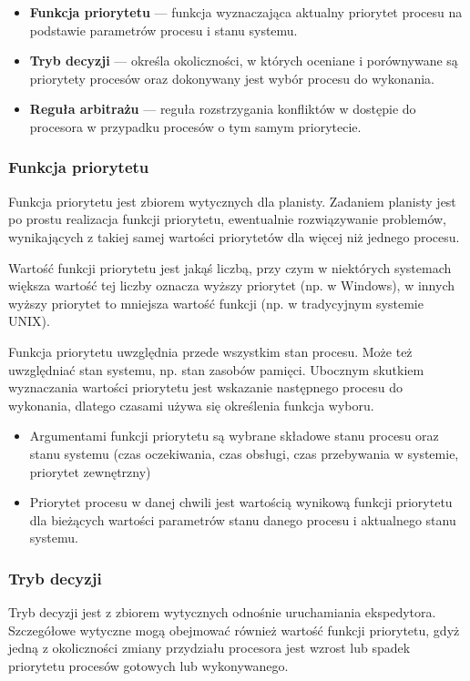 \documentclass[main.tex]{subfiles}
\begin{document}
    \begin{itemize}
        \item \textbf{Funkcja priorytetu} — funkcja wyznaczająca aktualny priorytet procesu na podstawie parametrów procesu i stanu systemu.
        \item \textbf{Tryb decyzji} — określa okoliczności, w których oceniane i porównywane są priorytety procesów oraz dokonywany jest wybór procesu do wykonania.
        \item \textbf{Reguła arbitrażu} — reguła rozstrzygania konfliktów w dostępie do procesora w przypadku procesów o tym samym priorytecie.
    \end{itemize}

    \subsubsection{Funkcja priorytetu}
    Funkcja priorytetu jest zbiorem wytycznych dla planisty. Zadaniem planisty jest po prostu realizacja funkcji priorytetu, ewentualnie rozwiązywanie problemów, wynikających z takiej samej wartości priorytetów dla więcej niż jednego procesu.

    Wartość funkcji priorytetu jest jakąś liczbą, przy czym w niektórych systemach większa wartość tej liczby oznacza wyższy priorytet (np. w Windows), w innych wyższy priorytet to mniejsza wartość funkcji (np. w tradycyjnym systemie UNIX).

    Funkcja priorytetu uwzględnia przede wszystkim stan procesu. Może też uwzględniać stan systemu, np. stan zasobów pamięci. Ubocznym skutkiem wyznaczania wartości priorytetu jest wskazanie następnego procesu do wykonania, dlatego czasami używa się określenia funkcja wyboru.

    \begin{itemize}
        \item Argumentami funkcji priorytetu są wybrane składowe stanu procesu oraz stanu systemu (czas oczekiwania, czas obsługi, czas przebywania w systemie, priorytet zewnętrzny)
        \item Priorytet procesu w danej chwili jest wartością wynikową funkcji priorytetu dla bieżących wartości parametrów stanu danego procesu i aktualnego stanu systemu.
    \end{itemize}

    \subsubsection{Tryb decyzji}
    Tryb decyzji jest z zbiorem wytycznych odnośnie uruchamiania ekspedytora. Szczegółowe wytyczne mogą obejmować również wartość funkcji priorytetu, gdyż jedną z okoliczności zmiany przydziału procesora jest wzrost lub spadek priorytetu procesów gotowych lub wykonywanego.
\end{document}
